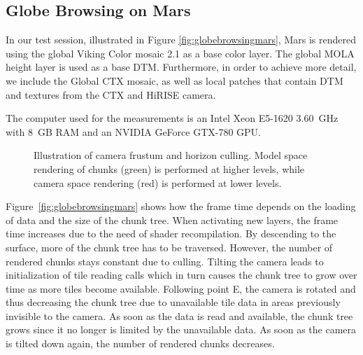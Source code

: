 \documentclass[journal]{vgtc}                %
\newcommand{\fig}[1]{Figure~\ref{fig:#1}}
\begin{document}
\subsection{Globe Browsing on Mars}



In our test session, illustrated in Figure \ref{fig:globebrowsingmars}, Mars is rendered using the global Viking Color mosaic 2.1 as a base color layer.
The global MOLA height layer is used as a base DTM.
Furthermore, in order to achieve more detail, we include the Global CTX mosaic, as well as local patches that contain DTM and textures from the CTX and HiRISE camera.

The computer used for the measurements is an Intel Xeon E5-1620 3.60~GHz with 8~GB RAM and an NVIDIA GeForce GTX-780 GPU.

\begin{figure}[b!]
    \centering
        \caption{Illustration of camera frustum and horizon culling. Model space rendering of chunks (green) is performed at higher levels, while camera space rendering (red) is performed at lower levels.}
    \label{fig:frustum_mars}
\end{figure}

\fig{globebrowsingmars} shows how the frame time depends on the loading of data and the size of the chunk tree.
When activating new layers, the frame time increases due to the need of shader recompilation.
By descending to the surface, more of the chunk tree has to be traversed. However, the number of rendered chunks stays constant due to culling.
Tilting the camera leads to initialization of tile reading calls which in turn causes the chunk tree to grow over time as more tiles become available.
Following point E, the camera is rotated and thus decreasing the chunk tree due to unavailable tile data in areas previously invisible to the camera.
As soon as the data is read and available, the chunk tree grows since it no longer is limited by the unavailable data.
As soon as the camera is tilted down again, the number of rendered chunks decreases.
\end{document}
